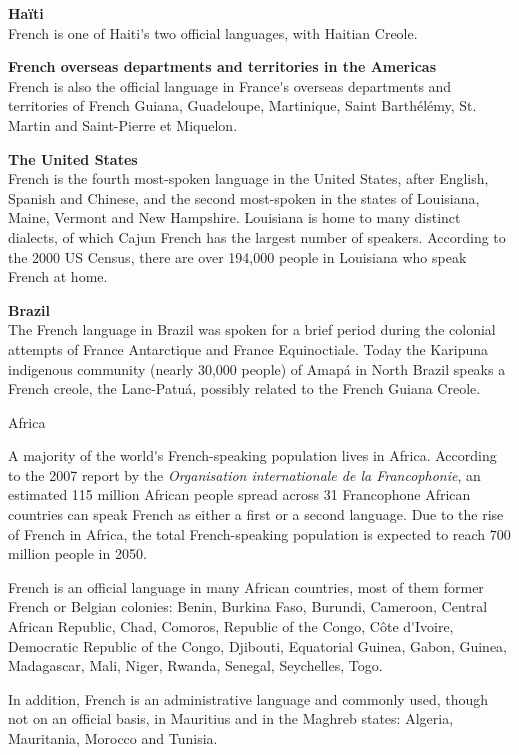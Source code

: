 \begin{multicols}{2}
{\bf Haïti}\\
French is one of Haiti{\mbox '}s two official languages, with Haitian Creole. 

{\bf French overseas departments and territories in the Americas}\\
French is also the official language in France{\mbox '}s overseas departments and territories of French Guiana, Guadeloupe, Martinique, Saint Barthélémy, St. Martin and Saint-Pierre et Miquelon.

{\bf The United States }\\
French is the fourth most-spoken language in the United States, after
English, Spanish and Chinese, and the second most-spoken in the states
of Louisiana, Maine, Vermont and New Hampshire. Louisiana is home to
many distinct dialects, of which Cajun French has the largest number
of speakers. According to the 2000 US Census, there are over 194,000
people in Louisiana who speak French at home.

{\bf Brazil}\\
The French language in Brazil was spoken for a brief period during the
colonial attempts of France Antarctique and France Equinoctiale. Today
the Karipuna indigenous community (nearly 30,000 people) of Amapá in
North Brazil speaks a French creole, the Lanc-Patuá, possibly related
to the French Guiana Creole.

\begin{center}
{\sc Africa}
\end{center}

A majority of the world{\mbox '}s French-speaking population lives in
Africa. According to the 2007 report by the {\em Organisation
internationale de la Francophonie}, an estimated 115 million African
people spread across 31 Francophone African countries can speak French
as either a first or a second language. Due to the rise of French in
Africa, the total French-speaking population is expected to reach 700
million people in 2050.

French is an official language in many African countries, most of them
former French or Belgian colonies: Benin, Burkina Faso, Burundi,
Cameroon, Central African Republic, Chad, Comoros, Republic of the
Congo, Côte d{\mbox '}Ivoire, Democratic Republic of the Congo, Djibouti,
Equatorial Guinea, Gabon, Guinea, Madagascar, Mali, Niger, Rwanda,
Senegal, Seychelles, Togo.

In addition, French is an administrative language and commonly used,
though not on an official basis, in Mauritius and in the Maghreb
states: Algeria, Mauritania, Morocco and Tunisia.


\end{multicols}
